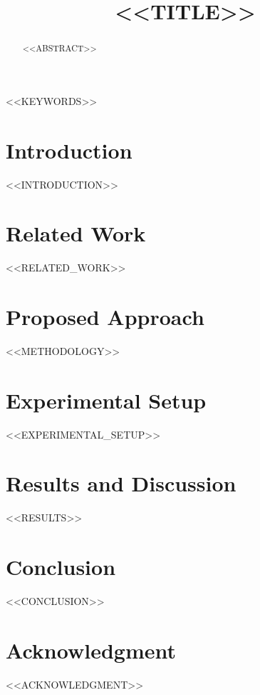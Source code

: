 \documentclass[conference]{IEEEtran}
\begin{document}
\title{<<TITLE>>}

\author{
}

\maketitle

\begin{abstract}
<<ABSTRACT>>
\end{abstract}

\begin{IEEEkeywords}
<<KEYWORDS>>
\end{IEEEkeywords}

\section{Introduction}
<<INTRODUCTION>>

\section{Related Work}
<<RELATED_WORK>>

\section{Proposed Approach}
<<METHODOLOGY>>

\section{Experimental Setup}
<<EXPERIMENTAL_SETUP>>

\section{Results and Discussion}
<<RESULTS>>

\section{Conclusion}
<<CONCLUSION>>

\section*{Acknowledgment}
<<ACKNOWLEDGMENT>>

\balance



\end{document}
